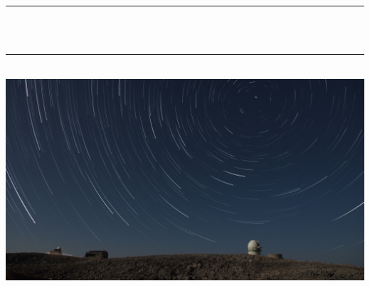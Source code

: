 \begin{titlepage}
    \newcommand{\HRule}{\rule{\linewidth}{0.5mm}}
    \center
    \makeatletter
    \HRule \\[0.6cm]
    { \huge \bfseries \@title}\\[0.3cm] 
    \HRule \\[2cm]
    \large
    \vspace{5cm}
    \center 
    \includegraphics[width=\linewidth]{title/skinakas_star_trails.jpg}
    
   
    
    
    
\end{titlepage}